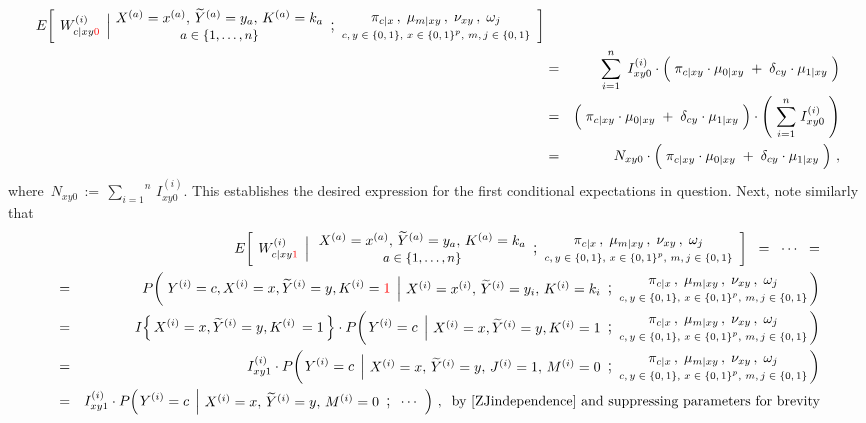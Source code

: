 \begin{enumerate}
\begin{eqnarray*}
		E\!\left[\;
			\left.
			W^{(i)}_{c \vert xy{\color{red}0}}
			\,\;\right\vert
			\!\!
			\EMConditionsWithValues
		\right]
	\\
	&=&
		\overset{n}{\underset{i=1}{\sum}} \;\,
		I^{(i)}_{xy0}
		\cdot
		\left(\;
			\pi_{c \vert xy}
			\cdot
			\mu_{0 \vert xy}
			\;\overset{{\color{white}.}}{+}\;
			\delta_{cy}
			\cdot
			\mu_{1 \vert xy}
		\;\right)
	\\
	&=&
		\left(\;
			\pi_{c \vert xy}
			\cdot
			\mu_{0 \vert xy}
			\;\overset{{\color{white}.}}{+}\;
			\delta_{cy}
			\cdot
			\mu_{1 \vert xy}
		\;\right)
		\cdot
		\left(\; \overset{n}{\underset{i=1}{\sum}} \; I^{(i)}_{xy0} \;\right)
	\\
	&=&
		N_{xy0}
		\cdot
		\left(\;
			\pi_{c \vert xy}
			\cdot
			\mu_{0 \vert xy}
			\;\overset{{\color{white}.}}{+}\;
			\delta_{cy}
			\cdot
			\mu_{1 \vert xy}
		\;\right)\,,
	\end{eqnarray*}
	where \,$N_{xy0} \,:=\, \overset{n}{\underset{i=1}{\sum}} \, I^{(i)}_{xy0}$.
	This establishes the desired expression for the first conditional expectations in question.
	Next, note similarly that
	\begin{eqnarray*}
	&&
		E\!\left[\;
			\left.
			W^{(i)}_{c \vert xy{\color{red}1}}
			\,\;\right\vert
			\EMConditionsWithValues
		\right]
		\;\; = \;\; \cdots \;\; =
	\\
	&=&
		P\!\left(\,
			\left.
			Y^{(i)} = c, X^{(i)} = x, \widetilde{Y}^{(i)} = y, K^{(i)} = {\color{red}1}
			\,\;\right\vert
			\!\!
			\ithEMConditionsWithValues
		\!\!\right)
	\\
	&=&
		I\!\left\{\,X^{(i)}=x , \widetilde{Y}^{(i)}=y , K^{(i)}\,=1\,\right\}
		\cdot
		P\!\left(
			\left.
			Y^{(i)} = c
			\,\;\right\vert
			\!\!
			\ithGYOneEMConditionsWithValues
		\!\!\right)
	\\
	&=&
		I^{(i)}_{xy1}
		\cdot
		P\!\left(
			\left.
			Y^{(i)} = c
			\,\;\right\vert
			\!\!
			\begin{array}{c}
				X^{(i)} = x,\, \widetilde{Y}^{(i)} = y,\, J^{(i)} = 1,\, M^{(i)} = 0
			\end{array}
			\textnormal{\large;}
			\modelParameters
		\!\!\right)
	\\
	&=&
		I^{(i)}_{xy1}
		\cdot
		P\!\left(
			\left.
			Y^{(i)} = c
			\,\;\right\vert
			\!\!
			\begin{array}{c}
				X^{(i)} = x,\, \widetilde{Y}^{(i)} = y,\, M^{(i)} = 0
			\end{array}
			\textnormal{\large;}
			\;\;\cdots\;\;
		\right)\,,
		\;\;
		\textnormal{by \eqref{ZJindependence} and suppressing parameters for brevity}

\end{eqnarray*}
\end{enumerate}
